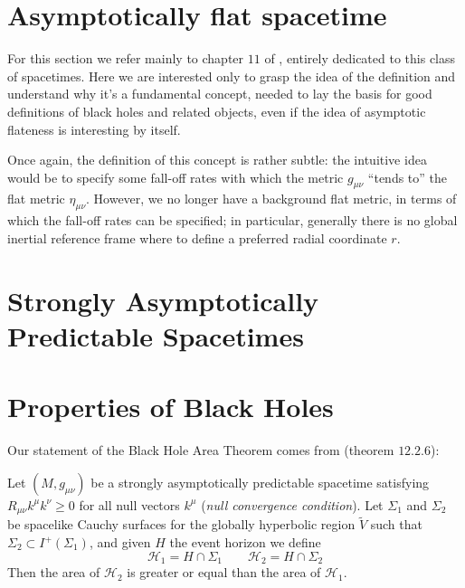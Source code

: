 \section{Asymptotically flat spacetime}
For this section we refer mainly to chapter \(11\) of \cite{wald1991general}, entirely dedicated to this class of spacetimes.
Here we are interested only to grasp the idea of the definition and understand why it's a fundamental concept, needed to lay the basis for good definitions of black holes and related objects, even if the idea of asymptotic flateness is interesting by itself.

Once again, the definition of this concept is rather subtle: the intuitive idea would be to specify some fall-off rates with which the metric \(g_{\mu\nu}\) ``tends to'' the flat metric  \(\eta_{\mu\nu}\). However, we no longer have a background flat metric, in terms of which the fall-off rates can be specified; in particular, generally there is no global inertial reference frame where to define a preferred radial coordinate \(r\).


\section{Strongly Asymptotically Predictable Spacetimes}

\section{Properties of Black Holes}


Our statement of the Black Hole Area Theorem comes from \cite{wald2010general} (theorem \(12.2.6\)):
\begin{theorem}
	Let \((M, g_{\mu\nu})\) be a strongly asymptotically predictable spacetime satisfying \(R_{\mu\nu}k^{\mu}k^{\nu} \ge 0\) for all null vectors \(k^{\mu}\) (\emph{null convergence condition}). Let \(\Sigma_1\) and \(\Sigma_2\) be spacelike Cauchy surfaces for the globally hyperbolic region \(\tilde{V}\) such that \(\Sigma_2 \subset I^+(\Sigma_1)\), and given \(H\) the event horizon we define
	\[
	\mathscr{H}_1 = H \cap \Sigma_1 \quad \quad \mathscr{H}_2 = H \cap \Sigma_2
	\]
	Then the area of \(\mathcal{H}_2\) is greater or equal than the area of \(\mathcal{H}_1\).
\end{theorem}


